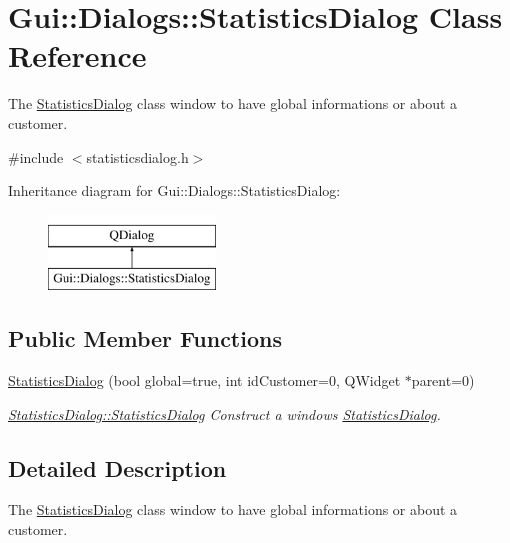 \hypertarget{classGui_1_1Dialogs_1_1StatisticsDialog}{\section{Gui\-:\-:Dialogs\-:\-:Statistics\-Dialog Class Reference}
\label{classGui_1_1Dialogs_1_1StatisticsDialog}
}


The \hyperlink{classGui_1_1Dialogs_1_1StatisticsDialog}{Statistics\-Dialog} class window to have global informations or about a customer.  




{\ttfamily \#include $<$statisticsdialog.\-h$>$}

Inheritance diagram for Gui\-:\-:Dialogs\-:\-:Statistics\-Dialog\-:\begin{figure}[H]
\begin{center}
\leavevmode
\includegraphics[height=2.000000cm]{d1/ddc/classGui_1_1Dialogs_1_1StatisticsDialog}
\end{center}
\end{figure}
\subsection*{Public Member Functions}
\begin{DoxyCompactItemize}
\item 
\hyperlink{classGui_1_1Dialogs_1_1StatisticsDialog_a6fe5b8b662958e2740f7a5905168bca9}{Statistics\-Dialog} (bool global=true, int id\-Customer=0, Q\-Widget $\ast$parent=0)
\begin{DoxyCompactList}\small\item\em \hyperlink{classGui_1_1Dialogs_1_1StatisticsDialog_a6fe5b8b662958e2740f7a5905168bca9}{Statistics\-Dialog\-::\-Statistics\-Dialog} Construct a windows \hyperlink{classGui_1_1Dialogs_1_1StatisticsDialog}{Statistics\-Dialog}. \end{DoxyCompactList}\end{DoxyCompactItemize}


\subsection{Detailed Description}
The \hyperlink{classGui_1_1Dialogs_1_1StatisticsDialog}{Statistics\-Dialog} class window to have global informations or about a customer. 

